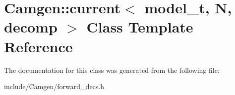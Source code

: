 \hypertarget{a00108}{\section{Camgen\-:\-:current$<$ model\-\_\-t, N, decomp $>$ Class Template Reference}
\label{a00108}
}


The documentation for this class was generated from the following file\-:\begin{DoxyCompactItemize}
\item 
include/\-Camgen/forward\-\_\-decs.\-h\end{DoxyCompactItemize}
